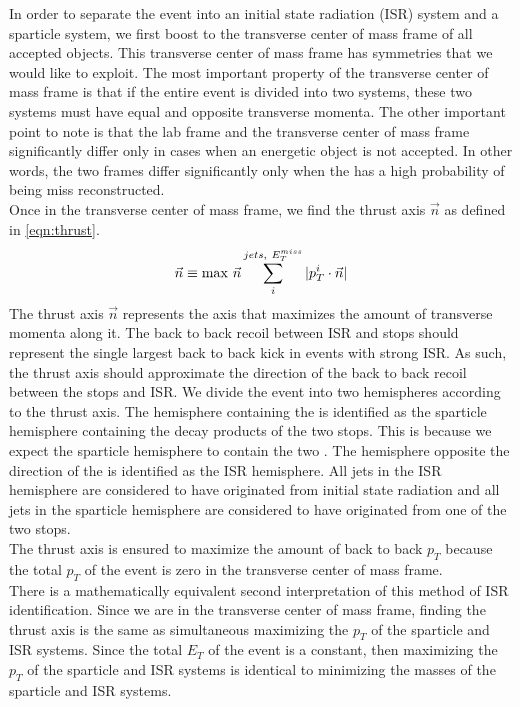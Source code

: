 In order to separate the event into an initial state radiation (ISR) system and a sparticle system, we first boost to the transverse center of mass frame of all accepted objects.  This transverse center of mass frame has symmetries that we would like to exploit.  The most important property of the transverse center of mass frame is that if the entire event is divided into two systems, these two systems must have equal and opposite transverse momenta.  The other important point to note is that the lab frame and the transverse center of mass frame significantly differ only in cases when an energetic object is not accepted.  In other words, the two frames differ significantly only when the \MET has a high probability of being miss reconstructed. \\

Once in the transverse center of mass frame, we find the thrust axis $\vec{n}$ as defined in \ref{eqn:thrust}.  
\begin{equation}
\label{eqn:thrust}
\vec{n} \equiv \max_{}\,{\vec{n}} \sum_i^{jets,~E^{miss}_T} |p_T^i \cdot \vec{n}|
\end{equation}
The thrust axis $\vec{n}$ represents the axis that maximizes the amount of transverse momenta along it.  The back to back recoil between ISR and stops should represent the single largest back to back kick in events with strong ISR.  As such, the thrust axis should approximate the direction of the back to back recoil between the stops and ISR.  We divide the event into two hemispheres according to the thrust axis.  The hemisphere containing the \MET is identified as the sparticle hemisphere containing the decay products of the two stops.  This is because we expect the sparticle hemisphere to contain the two \ninoone.  The hemisphere opposite the direction of the \MET is identified as the ISR hemisphere.  All jets in the ISR hemisphere are considered to have originated from initial state radiation and all jets in the sparticle hemisphere are considered to have originated from one of the two stops. \\
The thrust axis is ensured to maximize the amount of back to back $p_T$ because the total $p_T$ of the event is zero in the transverse center of mass frame. \\
There is a mathematically equivalent second interpretation of this method of ISR identification.  Since we are in the transverse center of mass frame, finding the thrust axis is the same as simultaneous maximizing the $p_T$ of the sparticle and ISR systems.  Since the total $E_T$ of the event is a constant, then maximizing the $p_T$ of the sparticle and ISR systems is identical to minimizing the masses of the sparticle and ISR systems.

